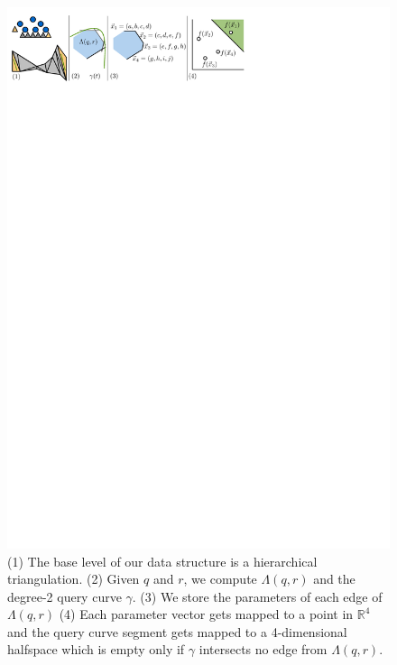 \documentclass[UKenglish]{lipics-v2019}
\begin{document}
\begin{figure}[tb]
    \centering
    \includegraphics[]{../panel}
    \caption{(1) The base level of our data structure is a hierarchical triangulation. (2) Given $q$ and $r$, we compute $\Lambda(q,r)$ and the degree-2 query curve $\gamma$. (3) We store the parameters of each edge of $\Lambda(q,r)$ (4) Each parameter vector gets mapped to a point in $\mathbb{R}^4$ and the query curve segment gets mapped to a 4-dimensional halfspace which is empty only if $\gamma$ intersects no edge from $\Lambda(q,r)$.}
    \label{fig:panel}
\end{figure}
\end{document}
